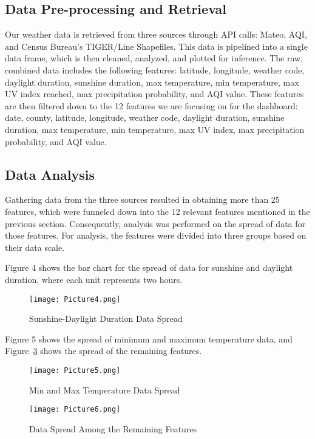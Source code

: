 \documentclass[a4paper, 12pt]{article}
\begin{document}
\subsection{Data Pre-processing and Retrieval}
\label{sec:data-preprocessing}
Our weather data is retrieved from three sources through API calls: Mateo, AQI, and Census Bureau’s TIGER/Line Shapefiles. This data is pipelined into a single data frame, which is then cleaned, analyzed, and plotted for inference. The raw, combined data includes the following features: latitude, longitude, weather code, daylight duration, sunshine duration, max temperature, min temperature, max UV index reached, max precipitation probability, and AQI value. These features are then filtered down to the 12 features we are focusing on for the dashboard: date, county, latitude, longitude, weather code, daylight duration, sunshine duration, max temperature, min temperature, max UV index, max precipitation probability, and AQI value.

\subsection{Data Analysis}
Gathering data from the three sources resulted in obtaining more than 25 features, which were funneled down into the 12 relevant features mentioned in the previous section. Consequently, analysis was performed on the spread of data for those features. For analysis, the features were divided into three groups based on their data scale. 

Figure 4 shows the bar chart for the spread of data for sunshine and daylight duration, where each unit represents two hours.

\begin{figure}[H]
\centering
\texttt{[image: Picture4.png]}
\caption{Sunshine-Daylight Duration Data Spread}
\label{fig:sunshine-daylight-duration}
\end{figure}

Figure 5 shows the spread of minimum and maximum temperature data, and Figure~\ref{fig:remaining-data-spread} shows the spread of the remaining features.

\begin{figure}[H]
\centering
\texttt{[image: Picture5.png]}
\caption{Min and Max Temperature Data Spread}
\label{fig:temperature-data-spread}
\end{figure}

\begin{figure}[H]
\centering
\texttt{[image: Picture6.png]}
\caption{Data Spread Among the Remaining Features}
\label{fig:remaining-data-spread}
\end{figure}
\end{document}
